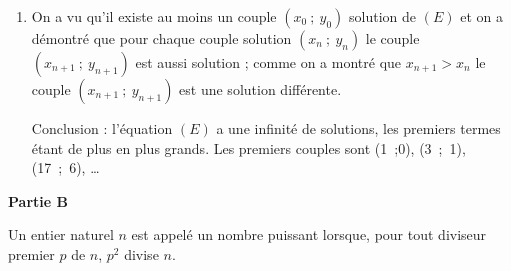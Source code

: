 \documentclass[10pt]{article}
\newcommand{\N}{\mathbb{N}}
\begin{document}
\begin{enumerate}
\begin{enumerate}
Donc $x_{n+1} = 3x_n + 8y_n$ et $y_{n+1} = x_n + 3y_n$.

Calculons la différence :

$x_{n+1}^2 - 8y_{n+1}^2 = \left(3x_n + 8y_n\right)^2 -  8\left(x_n + 3y_n \right)^2 = 9x_n^2 64y_n^2 + 48x_ny_n - 8\left(x_n^2 + 9y_n^2 + 6x_ny_n \right) = 9x_n^2 +  64y_n^2 + 48x_ny_n - 8x_n^2 - 72y_n^2 - 48x_ny_n = x_n - 8y_n^2 = 1$, d'après l'hypothèse de récurrence.

Le couple $\left(x_{n+1}~;~y_{n+1} \right)$ est aussi un couple solution.

On a montré que la proposition est vraie au rang $0$ et que si elle est vraie à un rang $n \in \N$ elle l'est aussi au rang $n + 1$ : d'après le principe de récurrence on a montré que pour tout naturel $n$, \: le couple $\left(x_n~;~y_n \right)$ est une solution de $(E)$.
		\item %
		
On calcule la différence :

$x_{n+1} - x_n = 3x_n + 8y_n - x_n = 2x_n + 8y_n$ ; cette somme est positive car on suppose que $x_n > 0$ et  $y_n \in \N,\: y_n \geqslant 0$.

On a donc $x_{n+1} - x_n > 0 \iff x_{n+1} > x_n$ : la suite $\left(x_n\right)$ est donc strictement croissante.


 	\end{enumerate}
\item  %
On a vu qu'il existe au moins un couple $\left(x_0~;~y_0\right)$ solution de $(E)$ et on a démontré que pour chaque couple solution $\left(x_n~;~y_n\right)$ le couple $\left(x_{n+1}~;~y_{n+1}\right)$ est aussi solution ; comme on a montré que $x_{n+1} > x_n$ le couple  $\left(x_{n+1}~;~y_{n+1}\right)$ est une solution différente.

Conclusion : l'équation $(E)$ a une infinité de solutions, les premiers termes étant de plus en plus grands. Les premiers couples sont (1~;0), \: (3~;~1), \: (17~;~6), \ldots
\end{enumerate}

\bigskip

\textbf{Partie B}

\medskip

Un entier naturel $n$ est appelé un nombre puissant lorsque, pour tout diviseur premier $p$ de $n$,\: $p^2$ divise $n$.
\end{document}
